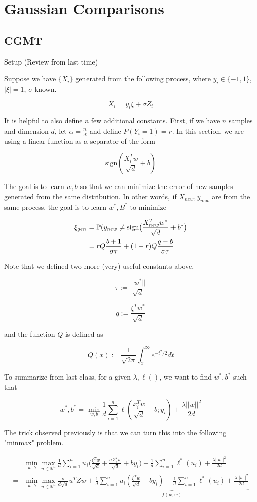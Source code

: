 \chapter{Gaussian Comparisons}


\section{CGMT}
Setup (Review from last time)

Suppose we have $\{X_i\}$ generated from the following process, where $y_i \in \{-1, 1\}$, $|\xi| = 1$, $\sigma$ known.

$$X_i = y_i \xi + \sigma Z_i$$

It is helpful to also define a few additional constants. First, if we have $n$ samples and dimension $d$, let $\alpha = \frac{n}{d}$ and define $P(Y_i = 1) = r$. In this section, we are using a linear function as a separator of the form 


$$\text{sign}(\frac{X_i^Tw}{\sqrt{d}} + b)$$

The goal is to learn $w, b$ so that we can minimize the error of new samples generated from the same distribution. In other words, if $X_{new}, y_{new}$ are from the same process, the goal is to learn $w^*, B^*$ to minimize

\begin{align*}
    \xi_{gen} &= \P(y_{new} \ne \text{sign}\big(\frac{X_{new}^Tw^*}{\sqrt{d}} + b^*\big) \\
    &= rQ\frac{b+1}{\sigma\tau} + (1-r)Q\frac{q-b}{\sigma \tau}
\end{align*}

Note that we defined two more (very) useful constants above, 

$$\tau := \frac{||w^*||}{\sqrt{d}}$$

$$q := \frac{\xi^Tw^*}{\sqrt{d}}$$

and the function $Q$ is defined as 

$$Q(x) := \frac{1}{\sqrt{2\pi}}\int_{x}^\infty e^{-t^2/2}dt$$

To summarize from last class, for a given $\lambda, \ell()$, we want to find $w^*, b^*$ such that


$$w^*, b^* = \min_{w,b} \frac{1}{d}\sum_{i=1}^n \ell(\frac{x_i^Tw}{\sqrt{d}} + b; y_i) + \frac{\lambda ||w||^2}{2d}$$

The trick observed previously is that we can turn this into the following "minmax" problem.


\begin{align*}
    &\min_{w,b} \max_{u \in \mathbb{R}^n} \frac{1}{d}\sum_{i=1}^n u_i\Big(\frac{\xi^Tw}{\sqrt{d}} + \frac{\sigma Z_i^T w}{\sqrt{d}} + by_i\Big) - \frac{1}{d}\sum_{i=1}^n \ell^*(u_i) + \frac{\lambda||w||^2}{2d} \\
    = &\min_{w,b} \max_{u \in \mathbb{R}^n} \frac{\sigma}{d\sqrt{d}} u^TZw + 
    \underbrace{\frac{1}{d}\sum_{i=1}^n u_i\left(\frac{\xi^Tw}{\sqrt{d}} + by_i\right)- \frac{1}{d}\sum_{i=1}^n \ell^*(u_i) + \frac{\lambda||w||^2}{2d}}_{f \left( u,w \right)}
\end{align*}

